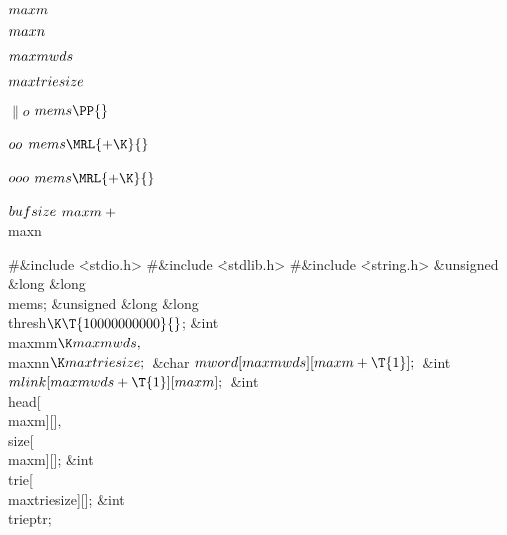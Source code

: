 \Y\B\4\D$\\{maxm}$ \5
\par
\B\4\D$\\{maxn}$ \5
\par
\B\4\D$\\{maxmwds}$ \5
\par
\B\4\D$\\{maxtriesize}$ \5
\par
\B\4\D$\|o$ \5
$\\{mems}\PP{}$\par
\B\4\D$\\{oo}$ \5
$\\{mems}\MRL{+{\K}}{}$\par
\B\4\D$\\{ooo}$ \5
$\\{mems}\MRL{+{\K}}{}$\par
\B\4\D$\\{bufsize}$ \5
$\\{maxm}+{}$\\{maxn}\par
\Y\B\8\#\&{include} \.{<stdio.h>}\6
\8\#\&{include} \.{<stdlib.h>}\6
\8\#\&{include} \.{<string.h>}\6
\&{unsigned} \&{long} \&{long} \\{mems};\6
\&{unsigned} \&{long} \&{long} \\{thresh}${}\K\T{10000000000}{}$;\6
\&{int} \\{maxmm}${}\K\\{maxmwds},{}$ \\{maxnn}${}\K\\{maxtriesize};{}$\6
\&{char} ${}\\{mword}[\\{maxmwds}][\\{maxm}+\T{1}];{}$\6
\&{int} ${}\\{mlink}[\\{maxmwds}+\T{1}][\\{maxm}];{}$\6
\&{int} \\{head}[\\{maxm}][]${},{}$ \\{size}[\\{maxm}][];\6
\&{int} \\{trie}[\\{maxtriesize}][];\6
\&{int} \\{trieptr};\6
